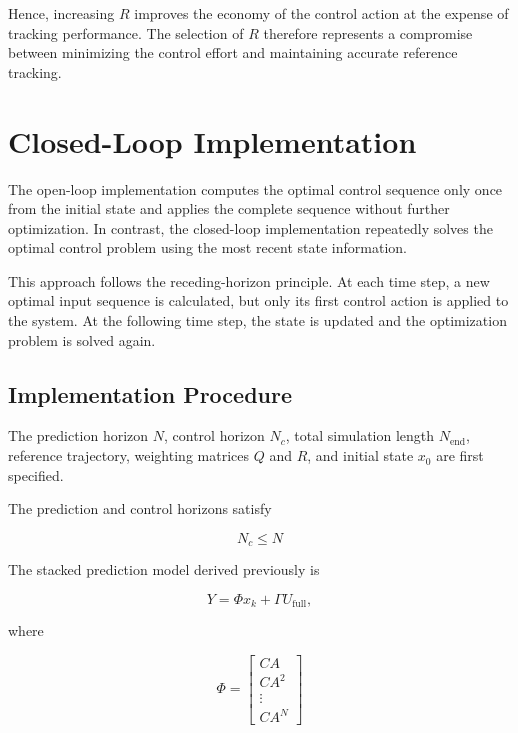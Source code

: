 Hence, increasing \(R\) improves the economy of the control action at the expense of tracking performance. The selection of \(R\) therefore represents a compromise between minimizing the control effort and maintaining accurate reference tracking.

\section{Closed-Loop Implementation}
\label{sec:closed_loop}

The open-loop implementation computes the optimal control sequence only once from the initial state and applies the complete sequence without further optimization. In contrast, the closed-loop implementation repeatedly solves the optimal control problem using the most recent state information.

This approach follows the receding-horizon principle. At each time step, a new optimal input sequence is calculated, but only its first control action is applied to the system. At the following time step, the state is updated and the optimization problem is solved again.

\subsection{Implementation Procedure}

The prediction horizon \(N\), control horizon \(N_c\), total simulation length \(N_{\mathrm{end}}\), reference trajectory, weighting matrices \(Q\) and \(R\), and initial state \(x_0\) are first specified.

The prediction and control horizons satisfy

\begin{equation}
    N_c \leq N
\end{equation}

The stacked prediction model derived previously is

\begin{equation}
    Y = \Phi x_k + \Gamma U_{\mathrm{full}},
    \label{eq:closed_loop_prediction}
\end{equation}

where

\begin{equation}
    \Phi =
    \begin{bmatrix}
        CA \\
        CA^2 \\
        \vdots \\
        CA^N
    \end{bmatrix}
\end{equation}

